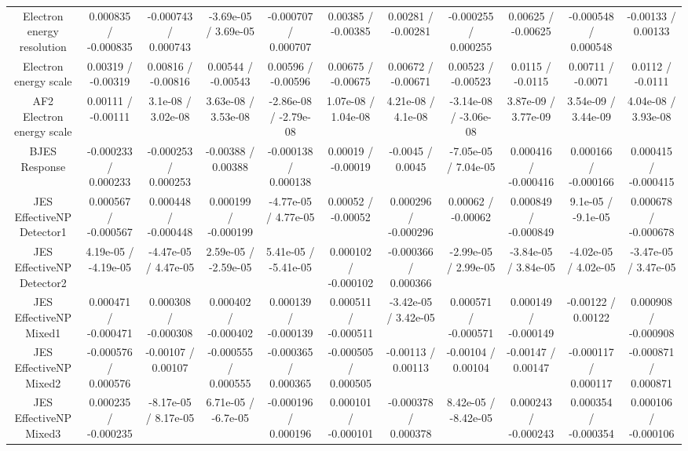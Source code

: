 \begin{table}[htbp]
\begin{center}
\begin{tabular}{|c|c|c|c|c|c|c|c|c|c|c|}
  Electron energy resolution & 0.000835 / -0.000835 & -0.000743 / 0.000743 & -3.69e-05 / 3.69e-05 & -0.000707 / 0.000707 & 0.00385 / -0.00385 & 0.00281 / -0.00281 & -0.000255 / 0.000255 & 0.00625 / -0.00625 & -0.000548 / 0.000548 & -0.00133 / 0.00133 \\ 
  Electron energy scale & 0.00319 / -0.00319 & 0.00816 / -0.00816 & 0.00544 / -0.00543 & 0.00596 / -0.00596 & 0.00675 / -0.00675 & 0.00672 / -0.00671 & 0.00523 / -0.00523 & 0.0115 / -0.0115 & 0.00711 / -0.0071 & 0.0112 / -0.0111 \\ 
  AF2 Electron energy scale & 0.00111 / -0.00111 & 3.1e-08 / 3.02e-08 & 3.63e-08 / 3.53e-08 & -2.86e-08 / -2.79e-08 & 1.07e-08 / 1.04e-08 & 4.21e-08 / 4.1e-08 & -3.14e-08 / -3.06e-08 & 3.87e-09 / 3.77e-09 & 3.54e-09 / 3.44e-09 & 4.04e-08 / 3.93e-08 \\ 
  BJES Response & -0.000233 / 0.000233 & -0.000253 / 0.000253 & -0.00388 / 0.00388 & -0.000138 / 0.000138 & 0.00019 / -0.00019 & -0.0045 / 0.0045 & -7.05e-05 / 7.04e-05 & 0.000416 / -0.000416 & 0.000166 / -0.000166 & 0.000415 / -0.000415 \\ 
  JES EffectiveNP Detector1 & 0.000567 / -0.000567 & 0.000448 / -0.000448 & 0.000199 / -0.000199 & -4.77e-05 / 4.77e-05 & 0.00052 / -0.00052 & 0.000296 / -0.000296 & 0.00062 / -0.00062 & 0.000849 / -0.000849 & 9.1e-05 / -9.1e-05 & 0.000678 / -0.000678 \\ 
  JES EffectiveNP Detector2 & 4.19e-05 / -4.19e-05 & -4.47e-05 / 4.47e-05 & 2.59e-05 / -2.59e-05 & 5.41e-05 / -5.41e-05 & 0.000102 / -0.000102 & -0.000366 / 0.000366 & -2.99e-05 / 2.99e-05 & -3.84e-05 / 3.84e-05 & -4.02e-05 / 4.02e-05 & -3.47e-05 / 3.47e-05 \\ 
  JES EffectiveNP Mixed1 & 0.000471 / -0.000471 & 0.000308 / -0.000308 & 0.000402 / -0.000402 & 0.000139 / -0.000139 & 0.000511 / -0.000511 & -3.42e-05 / 3.42e-05 & 0.000571 / -0.000571 & 0.000149 / -0.000149 & -0.00122 / 0.00122 & 0.000908 / -0.000908 \\ 
  JES EffectiveNP Mixed2 & -0.000576 / 0.000576 & -0.00107 / 0.00107 & -0.000555 / 0.000555 & -0.000365 / 0.000365 & -0.000505 / 0.000505 & -0.00113 / 0.00113 & -0.00104 / 0.00104 & -0.00147 / 0.00147 & -0.000117 / 0.000117 & -0.000871 / 0.000871 \\ 
  JES EffectiveNP Mixed3 & 0.000235 / -0.000235 & -8.17e-05 / 8.17e-05 & 6.71e-05 / -6.7e-05 & -0.000196 / 0.000196 & 0.000101 / -0.000101 & -0.000378 / 0.000378 & 8.42e-05 / -8.42e-05 & 0.000243 / -0.000243 & 0.000354 / -0.000354 & 0.000106 / -0.000106 \\ 

\end{tabular}
\end{center}
\end{table}
